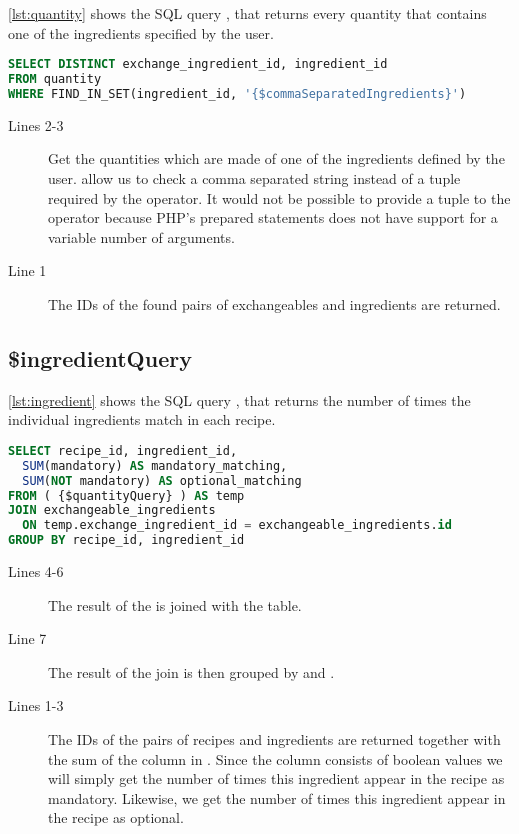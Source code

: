 \autoref{lst:quantity} shows the SQL query , that returns every quantity that contains one of the ingredients specified by the user.
\begin{lstlisting}[language=SQL, float=h, label={lst:quantity}, caption={\$quantityQuery, return quantities that match the search.}]
SELECT DISTINCT exchange_ingredient_id, ingredient_id
FROM quantity
WHERE FIND_IN_SET(ingredient_id, '{$commaSeparatedIngredients}')
\end{lstlisting}
\begin{description}
\item[Lines 2-3] Get the quantities which are made of one of the ingredients defined by the user.  allow us to check a comma separated string instead of a tuple required by the  operator. It would not be possible to provide a tuple to the  operator because PHP's prepared statements does not have support for a variable number of arguments.
\item[Line 1] The IDs of the found pairs of exchangeables and ingredients are returned.
\end{description}



\subsection*{\$ingredientQuery}
\autoref{lst:ingredient} shows the SQL query , that returns the number of times the individual ingredients match in each recipe.
\begin{lstlisting}[language=SQL, float=h, label={lst:ingredient}, caption={\$ingredientQuery, returns the number of times the individual ingredients appear in each recipe.}]
SELECT recipe_id, ingredient_id,
  SUM(mandatory) AS mandatory_matching,
  SUM(NOT mandatory) AS optional_matching
FROM ( {$quantityQuery} ) AS temp
JOIN exchangeable_ingredients
  ON temp.exchange_ingredient_id = exchangeable_ingredients.id
GROUP BY recipe_id, ingredient_id
\end{lstlisting}
\begin{description}
\item[Lines 4-6] The result of the  is joined with the  table.
\item[Line 7] The result of the join is then grouped by  and .
\item[Lines 1-3] The IDs of the pairs of recipes and ingredients are returned together with the sum of the  column in . Since the  column consists of boolean values we will simply get the number of times this ingredient appear in the recipe as mandatory. Likewise, we get the number of times this ingredient appear in the recipe as optional.
\end{description}



